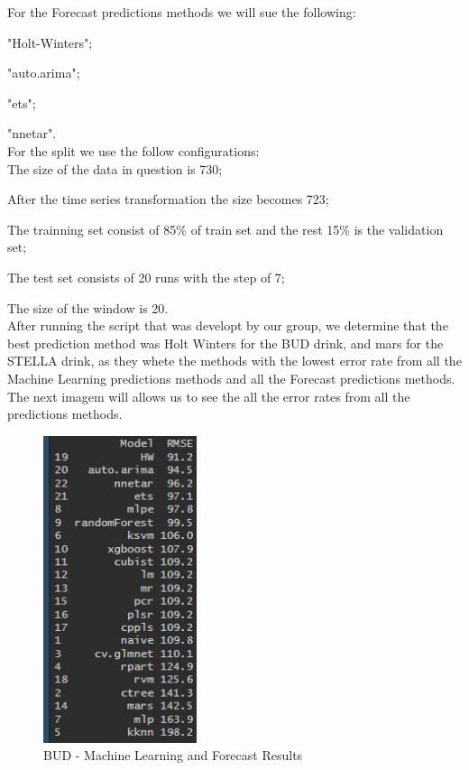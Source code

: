 For the Forecast predictions methods we will sue the following:

\quad \textbullet "Holt-Winters";

\quad \textbullet "auto.arima";

\quad \textbullet "ets";

\quad \textbullet "nnetar".\\


For the split we use the follow configurations:\\

\quad \textbullet The size of the data in question is 730;

\quad \textbullet After the time series transformation the size becomes 723;

\quad \textbullet The trainning set consist of 85\% of train set and the rest 15\% is the validation set;

\quad \textbullet The test set consists of 20 runs with the step of 7;

\quad \textbullet The size of the window is 20. \\


After running the script that was developt by our group, we determine that the best prediction method was Holt Winters for the BUD drink, and mars for the STELLA drink, as they whete the methods with the lowest error rate from all the Machine Learning predictions methods and all the Forecast predictions methods. The next imagem will allows us to see the all the error rates from all the predictions methods.\\

\begin{figure}[H]
    \centering
    \includegraphics[width=0.4\textwidth]{assets/bud-split.jpeg}
    \caption{BUD - Machine Learning and Forecast Results}
    \label{fig:split_bud}
    \end{figure}

